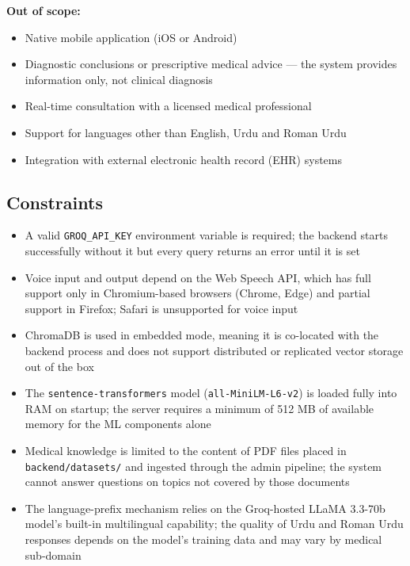 \textbf{Out of scope:}
\begin{itemize}
  \item Native mobile application (iOS or Android)
  \item Diagnostic conclusions or prescriptive medical advice --- the system provides
        information only, not clinical diagnosis
  \item Real-time consultation with a licensed medical professional
  \item Support for languages other than English, Urdu and Roman Urdu
  \item Integration with external electronic health record (EHR) systems
\end{itemize}

\subsection{Constraints}

\begin{itemize}
  \item A valid \texttt{GROQ\_API\_KEY} environment variable is required; the backend
        starts successfully without it but every query returns an error until it is set
  \item Voice input and output depend on the Web Speech API, which has full support only
        in Chromium-based browsers (Chrome, Edge) and partial support in Firefox; Safari
        is unsupported for voice input
  \item ChromaDB is used in embedded mode, meaning it is co-located with the backend
        process and does not support distributed or replicated vector storage out of the box
  \item The \texttt{sentence-transformers} model (\texttt{all-MiniLM-L6-v2}) is loaded
        fully into RAM on startup; the server requires a minimum of 512 MB of available
        memory for the ML components alone
  \item Medical knowledge is limited to the content of PDF files placed in
        \texttt{backend/datasets/} and ingested through the admin pipeline; the system
        cannot answer questions on topics not covered by those documents
  \item The language-prefix mechanism relies on the Groq-hosted LLaMA 3.3-70b model's
        built-in multilingual capability; the quality of Urdu and Roman Urdu responses
        depends on the model's training data and may vary by medical sub-domain
\end{itemize}

